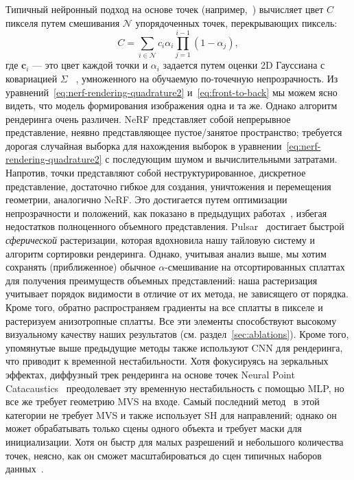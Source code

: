 Типичный нейронный подход на основе точек (например,~\cite{kopanas21,kopanas22}) вычисляет цвет $C$ пикселя путем смешивания $\mathcal{N}$ упорядоченных точек, перекрывающих пиксель:
\begin{equation}
    \label{eq:front-to-back}
    C = \sum_{i \in \mathcal{N}}
    c_{i}\alpha_{i}
    \prod_{j=1}^{i-1}(1-\alpha_{j}),
\end{equation}
где $\mathbf{c}_i$ — это цвет каждой точки и $\alpha_i$ задается путем оценки 2D Гауссиана с ковариацией $\Sigma$ ~\cite{yifan19}, умноженного на обучаемую по-точечную непрозрачность. 
Из уравнений~\ref{eq:nerf-rendering-quadrature2} и~\ref{eq:front-to-back} мы можем ясно видеть, что модель формирования изображения одна и та же. Однако алгоритм рендеринга очень различен. NeRF представляет собой непрерывное представление, неявно представляющее пустое/занятое пространство; требуется дорогая случайная выборка для нахождения выборок в уравнении~\ref{eq:nerf-rendering-quadrature2} с последующим шумом и вычислительными затратами. Напротив, точки представляют собой неструктурированное, дискретное представление, достаточно гибкое для создания, уничтожения и перемещения геометрии, аналогично NeRF. Это достигается путем оптимизации непрозрачности и положений, как показано в предыдущих работах~\cite{kopanas21}, избегая недостатков полноценного объемного представления. 
Pulsar~\cite{Lassner_2021_CVPR} достигает быстрой \emph{сферической} растеризации, которая вдохновила нашу тайловую систему и алгоритм сортировки рендеринга. Однако, учитывая анализ выше, мы хотим сохранять (приближенное) обычное $\alpha$-смешивание на отсортированных сплаттах для получения преимуществ объемных представлений: наша растеризация учитывает порядок видимости в отличие от их метода, не зависящего от порядка. Кроме того,
 обратно распространяем градиенты на все сплатты в пикселе и растеризуем анизотропные сплатты.
Все эти элементы способствуют высокому визуальному качеству наших результатов (см. раздел~\ref{sec:ablations}).
Кроме того,
упомянутые выше предыдущие методы
также используют CNN для рендеринга, что приводит к временной нестабильности.
Хотя фокусируясь на зеркальных эффектах, диффузный трек рендеринга на основе точек Neural Point Catacaustics~\cite{kopanas22} преодолевает эту временную нестабильность с помощью MLP, но все же требует геометрию MVS на входе.
Самый последний метод~\cite{zhang2022} в этой категории не требует MVS и также использует SH для направлений; однако он может обрабатывать только сцены одного объекта и требует маски для инициализации. Хотя он быстр для малых разрешений и небольшого количества точек, неясно, как он сможет масштабироваться до сцен типичных наборов данных~\cite{knapitsch2017tanks,hedman2018deep,barron2022mipnerf360}.
